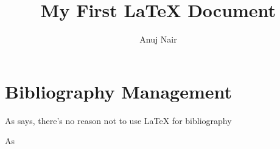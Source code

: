 \documentclass{article}
\author{Anuj Nair}
\title{My First {\LaTeX} Document}
\begin{document}
\maketitle

\section{Bibliography Management}

As \parencite{test} says, there's no reason not to use \LaTeX{} for bibliography

As \textcite{test}



\printbibliography
\end{document}
